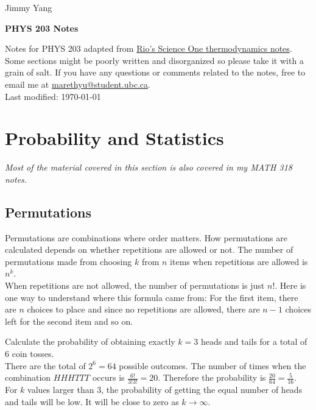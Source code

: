 \documentclass[12pt, a4paper]{article}
\newcommand{\doctitle}{PHYS 203 Notes}
\newcommand{\name}{Jimmy Yang}
\newcounter{exa}
\begin{document}
\begin{flushright}
\name
\end{flushright}

\begin{center}
\Large
\bfseries
\doctitle
\end{center}

\thispagestyle{plain}

\begin{center}
Notes for PHYS 203 adapted from \href{https://github.com/RioWeil/SCIE001-thermo-notes}{Rio's Science One thermodynamics notes}. Some sections might be poorly written and disorganized so please take it with a grain of salt. If you have any questions or comments related to the notes, free to email me at \href{mailto:marethyu@student.ubc.ca}{marethyu@student.ubc.ca}. \\
Last modified: \today
\end{center}

\tableofcontents

\section{Probability and Statistics}

\textit{Most of the material covered in this section is also covered in my MATH 318 notes.}

\subsection{Permutations}

Permutations are combinations where order matters. How permutations are calculated depends on whether repetitions are allowed or not. The number of permutations made from choosing $k$ from $n$ items when repetitions are allowed is $n^k$. \\

When repetitions are not allowed, the number of permutations is just $n!$. Here is one way to understand where this formula came from: For the first item, there are $n$ choices to place and since no repetitions are allowed, there are $n-1$ choices left for the second item and so on.

\begin{texample}
Calculate the probability of obtaining exactly $k=3$ heads and tails for a total of 6 coin tosses. \\

There are the total of $2^6=64$ possible outcomes. The number of times when the combination $HHHTTT$ occurs is $\frac{6!}{3!3!}=20$. Therefore the probability is $\frac{20}{64}=\frac{5}{16}$. \\

For $k$ values larger than $3$, the probability of getting the equal number of heads and tails will be low. It will be close to zero as $k \to \infty$.
\end{texample}
\end{document}
